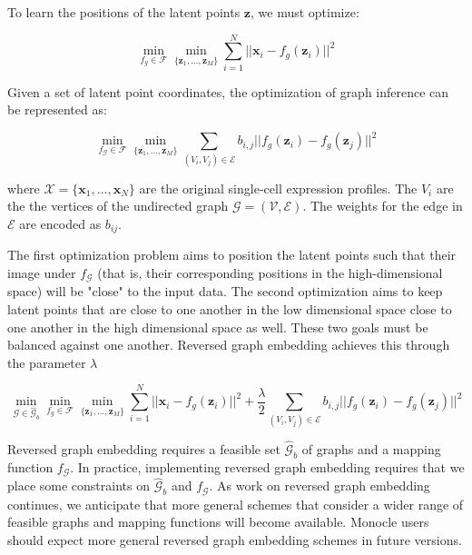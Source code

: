 \documentclass[10pt,oneside]{article}\usepackage[]{graphicx}\usepackage[]{color}
\begin{document}
To learn the positions of the latent points $\mathbf{z}$, we must optimize:

\begin{equation}
\mathop{min}_{f_g \in \mathcal{F}} \mathop{min}_{\{\mathbf{z}_1, ...,
\mathbf{z}_M\}} \sum_{i = 1}^N ||\mathbf{x}_i - f_g (\mathbf{z}_i)||^2
\end{equation}

Given a set of latent point coordinates, the optimization of graph inference can 
be represented as:

\begin{equation} \label{eq:mintree}
\mathop{min}_{f_\mathcal{G} \in \mathcal{F}} \mathop{min}_{\{\mathbf{z}_1, ..., \mathbf{z}_M\}} \sum_{(V_i, V_j) \in
\mathcal{E}} b_{i,j}||f_g(\mathbf{z}_i) - f_g(\mathbf{z}_j)||^2
\end{equation}

where
$\mathcal{X} = \{ \mathbf{x}_1, ..., \mathbf{x}_N\}$ are the original 
single-cell expression profiles. The $V_i$ are the the vertices of the 
undirected graph $\mathcal{G} = (\mathcal{V}, \mathcal{E})$. The weights for the 
edge in $\mathcal{E}$ are encoded as $b_{ij}$.

The first optimization problem aims to position the latent points such that their
image under $f_\mathcal{G}$ (that is, their corresponding positions in the high-dimensional space) 
will be "close" to the input data. The second optimization aims to keep latent
points that are close to one another in the low dimensional space close to one 
another in the high dimensional space as well. These two goals must be balanced
against one another. Reversed graph embedding achieves this through the parameter
$\lambda$

\begin{equation}
\mathop{min}_{\mathcal{G} \in \hat{\mathcal{G}}_b}\mathop{min}_{f_g \in \mathcal{F}} \mathop{min}_{\{\mathbf{z}_1, ...,
\mathbf{z}_M\}} \sum_{i = 1}^N ||\mathbf{x}_i - f_g (\mathbf{z}_i)||^2 + \frac{\lambda}{2} \sum_{(V_i, V_j) \in \mathcal{E}}
b_{i,j}||f_g(\mathbf{z}_i) - f_g(\mathbf{z}_j)||^2
\end{equation}

Reversed graph embedding requires a feasible set $\hat{\mathcal{G}}_b$ of graphs and a 
mapping function $f_\mathcal{G}$. In practice, implementing reversed graph embedding
requires that we place some constraints on $\hat{\mathcal{G}}_b$ and $f_\mathcal{G}$.
As work on reversed graph embedding continues, we anticipate that more general 
schemes that consider a wider range of feasible graphs and mapping functions will
become available. Monocle users should expect more general reversed graph embedding
schemes in future versions.
\end{document}
